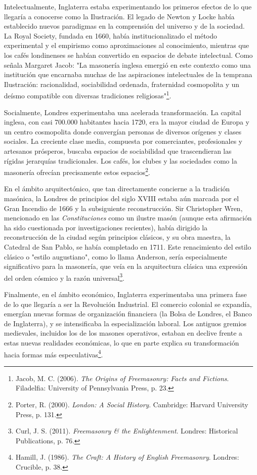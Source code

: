 \documentclass[a4paper,12pt,twoside]{book}
\begin{document}
Intelectualmente, Inglaterra estaba experimentando los primeros efectos de lo que llegaría a conocerse como la Ilustración. El legado de Newton y Locke había establecido nuevos paradigmas en la comprensión del universo y de la sociedad. La Royal Society, fundada en 1660, había institucionalizado el método experimental y el empirismo como aproximaciones al conocimiento, mientras que los cafés londinenses se habían convertido en espacios de debate intelectual. Como señala Margaret Jacob: "La masonería inglesa emergió en este contexto como una institución que encarnaba muchas de las aspiraciones intelectuales de la temprana Ilustración: racionalidad, sociabilidad ordenada, fraternidad cosmopolita y un deísmo compatible con diversas tradiciones religiosas"\footnote{Jacob, M. C. (2006). \textit{The Origins of Freemasonry: Facts and Fictions}. Filadelfia: University of Pennsylvania Press, p. 23.}.

Socialmente, Londres experimentaba una acelerada transformación. La capital inglesa, con casi 700.000 habitantes hacia 1720, era la mayor ciudad de Europa y un centro cosmopolita donde convergían personas de diversos orígenes y clases sociales. La creciente clase media, compuesta por comerciantes, profesionales y artesanos prósperos, buscaba espacios de sociabilidad que trascendieran las rígidas jerarquías tradicionales. Los cafés, los clubes y las sociedades como la masonería ofrecían precisamente estos espacios\footnote{Porter, R. (2000). \textit{London: A Social History}. Cambridge: Harvard University Press, p. 131.}.

En el ámbito arquitectónico, que tan directamente concierne a la tradición masónica, la Londres de principios del siglo XVIII estaba aún marcada por el Gran Incendio de 1666 y la subsiguiente reconstrucción. Sir Christopher Wren, mencionado en las \textit{Constituciones} como un ilustre masón (aunque esta afirmación ha sido cuestionada por investigaciones recientes), había dirigido la reconstrucción de la ciudad según principios clásicos, y su obra maestra, la Catedral de San Pablo, se había completado en 1711. Este renacimiento del estilo clásico o "estilo augustiano", como lo llama Anderson, sería especialmente significativo para la masonería, que veía en la arquitectura clásica una expresión del orden cósmico y la razón universal\footnote{Curl, J. S. (2011). \textit{Freemasonry & the Enlightenment}. Londres: Historical Publications, p. 76.}.

Finalmente, en el ámbito económico, Inglaterra experimentaba una primera fase de lo que llegaría a ser la Revolución Industrial. El comercio colonial se expandía, emergían nuevas formas de organización financiera (la Bolsa de Londres, el Banco de Inglaterra), y se intensificaba la especialización laboral. Los antiguos gremios medievales, incluidos los de los masones operativos, estaban en declive frente a estas nuevas realidades económicas, lo que en parte explica su transformación hacia formas más especulativas\footnote{Hamill, J. (1986). \textit{The Craft: A History of English Freemasonry}. Londres: Crucible, p. 38.}.
\end{document}
